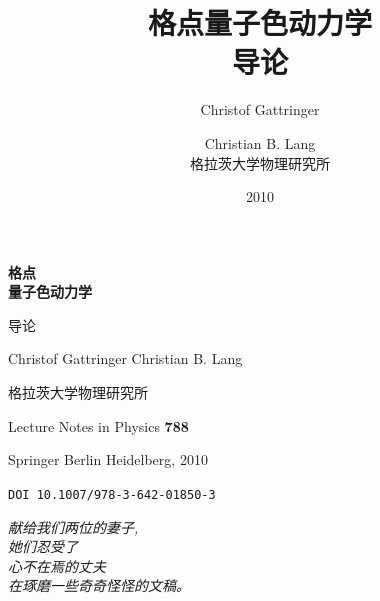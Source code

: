 \documentclass[11pt]{ctexbook}
\title{\textbf{格点量子色动力学}\\ \large 导论}
\author{Christof Gattringer \and Christian B. Lang\\[4mm]
        \normalsize 格拉茨大学物理研究所}
\date{2010}
\begin{document}
\frontmatter

\begin{titlepage}
  \centering
  \vspace*{2.5cm}
  {\Huge\bfseries 格点\\[4mm] 量子色动力学\par}
  \vspace{8mm}
  {\LARGE 导论\par}
  \vspace{20mm}
  {\Large Christof Gattringer \quad Christian B. Lang\par}
  \vspace{4mm}
  {\large 格拉茨大学物理研究所\par}
  \vspace{20mm}
  {\large Lecture Notes in Physics \textbf{788}\par}
  \vspace{3mm}
  {\normalsize Springer Berlin Heidelberg, 2010\par}
  \vspace{2mm}
  {\small \texttt{DOI 10.1007/978-3-642-01850-3}\par}
  \vfill
\end{titlepage}

\thispagestyle{empty}
\vspace*{\fill}
\begin{center}
\begin{minipage}{0.8\textwidth}\centering
\textit{献给我们两位的妻子,\\ 她们忍受了\\ 心不在焉的丈夫\\ 在琢磨一些奇奇怪怪的文稿。}
\end{minipage}
\end{center}
\vspace*{\fill}
\clearpage

\tableofcontents



\mainmatter














\appendix


\backmatter
\end{document}
